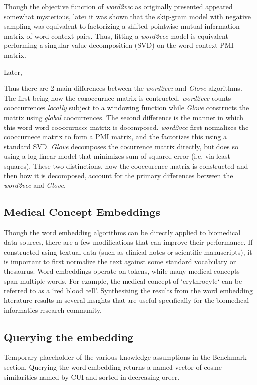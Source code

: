 \documentclass{ws-procs11x85}
\begin{document}
Though the objective function of \emph{word2vec} as originally presented appeared somewhat mysterious, later it was shown that the skip-gram model with negative sampling was equivalent to factorizing a shifted pointwise mutual information matrix\cite{levy2014neural} of word-context pairs. Thus, fitting a \emph{word2vec} model is equivalent performing a singular value decomposition (SVD) on the word-context PMI matrix.

Later, 

Thus there are 2 main differences between the \emph{word2vec} and \emph{Glove} algorithms. The first being how the conoccurnce matrix is contructed.  \emph{word2vec} counts cooccurrences \emph{locally} subject to a windowing function while \emph{Glove} constructs the matrix using \emph{global} coocurrences. The second difference is the manner in which this word-word cooccurnece matrix is docomposed. \emph{word2vec} first normalizes the cooccurnece matrix to form a PMI matrix, and the factorizes this using a standard SVD. \emph{Glove} decomposes the cocurrence matrix directly, but does so using a log-linear model that minimizes sum of squared error (i.e. via least-squares). These two distinctions, how the cooccurence matrix is constructed and then how it is decomposed, account for the primary differences between the \emph{word2vec} and \emph{Glove}.

 \subsection{Medical Concept Embeddings}
 Though the word embedding algorithms can be directly applied to biomedical data sources, there are a few modifications that can improve their performance. If constructed using textual data (such as clinical notes or scientific manuscripts), it is important to first normalize the text against some standard vocabulary or thesaurus. Word embeddings operate on tokens, while many medical concepts span multiple words. For example, the medical concept of `erythrocyte` can be referred to as a `red blood cell'.  
Synthesizing the results from the word embedding literature results in several insights that are useful specifically for the biomedical informatics research community. 

\subsection{Querying the embedding}
Temporary placeholder of the various knowledge assumptions in the Benchmark section. Querying the word embedding returns a named vector of cosine similarities named by CUI and sorted in decreasing order. 
\end{document}
